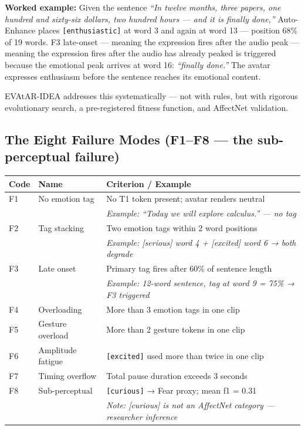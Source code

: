 \documentclass[12pt,a4paper]{article}
\begin{document}
\begin{speechbox}
\textbf{Worked example:} Given the sentence \textit{``In twelve months, three papers, one hundred
and sixty-six dollars, two hundred hours --- and it is finally done,''} Auto-Enhance places
\texttt{[enthusiastic]} at word 3 and again at word 13 --- position 68\% of 19 words.
F3 late-onset — meaning the expression fires after the audio peak — meaning the expression fires after the audio has already peaked is triggered because the emotional peak arrives at word 16: \textit{``finally done.''}
The avatar expresses enthusiasm before the sentence reaches its emotional content.

EVAtAR-IDEA addresses this systematically --- not with rules, but with rigorous evolutionary
search, a pre-registered fitness function, and AffectNet validation.
\end{speechbox}

\subsection{The Eight Failure Modes (F1--F8 — the sub-perceptual failure)}

\begin{center}
\begin{tabular}{@{}lll@{}}
\toprule
\textbf{Code} & \textbf{Name} & \textbf{Criterion / Example} \\
\midrule
F1 & No emotion tag & No T1 token present; avatar renders neutral \\
   & & \textit{Example: ``Today we will explore calculus.'' --- no tag} \\
F2 & Tag stacking & Two emotion tags within 2 word positions \\
   & & \textit{Example: [serious] word 4 + [excited] word 6 → both degrade} \\
F3 & Late onset & Primary tag fires after 60\% of sentence length \\
   & & \textit{Example: 12-word sentence, tag at word 9 = 75\% → F3 triggered} \\
F4 & Overloading & More than 3 emotion tags in one clip \\
F5 & Gesture overload & More than 2 gesture tokens in one clip \\
F6 & Amplitude fatigue & \texttt{[excited]} used more than twice in one clip \\
F7 & Timing overflow & Total pause duration exceeds 3 seconds \\
F8 & Sub-perceptual & \texttt{[curious]} → Fear proxy; mean f1 = 0.31 \\
   & & \textit{Note: [curious] is not an AffectNet category --- researcher inference} \\
\bottomrule
\end{tabular}
\end{center}
\end{document}
